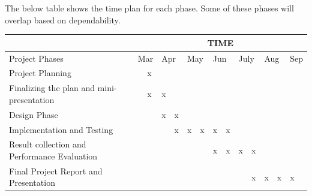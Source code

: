 \documentclass[titlepage]{report}
\begin{document}
The below table shows the time plan for each phase. Some of these phases will overlap based on dependability.

\pagebreak
\begin{table}[]
\begin{tabular}{|l|l|l|l|l|l|l|l|l|l|l|l|l|l|}
\hline
                                             & \multicolumn{13}{c|}{TIME}                                                                                                                                             \\ \hline
Project Phases                               & \multicolumn{2}{l|}{Mar} & \multicolumn{2}{l|}{Apr} & \multicolumn{2}{l|}{May} & \multicolumn{2}{l|}{Jun} & \multicolumn{2}{l|}{July} & \multicolumn{2}{l|}{Aug} & Sep \\ \hline
Project Planning                             &            & x           &             &            &             &            &             &            &             &             &             &            &     \\ \hline
Finalizing the plan and mini-presentation    &            & x           & x           &            &             &            &             &            &             &             &             &            &     \\ \hline
Design Phase                                 &            &             & x           & x          &             &            &             &            &             &             &             &            &     \\ \hline
Implementation and Testing                   &            &             &             & x          & x           & x          & x           & x          &             &             &             &            &     \\ \hline
Result collection and Performance Evaluation &            &             &             &            &             &            & x           & x          & x           & x           &             &            &     \\ \hline
Final Project Report and Presentation        &            &             &             &            &             &            &             &            &             & x           & x           & x          & x   \\ \hline
\end{tabular}
\end{table}
\end{document}
